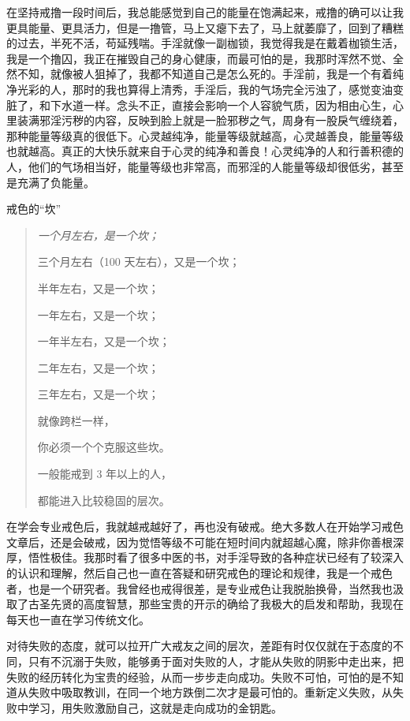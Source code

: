 在坚持戒撸一段时间后，我总能感觉到自己的能量在饱满起来，戒撸的确可以让我更具能量、更具活力，但是一撸管，马上又瘪下去了，马上就萎靡了，回到了糟糕的过去，半死不活，苟延残喘。手淫就像一副枷锁，我觉得我是在戴着枷锁生活，我是一个撸囚，我正在摧毁自己的身心健康，而最可怕的是，我那时浑然不觉、全然不知，就像被人狙掉了，我都不知道自己是怎么死的。手淫前，我是一个有着纯净光彩的人，那时的我也算得上清秀，手淫后，我的气场完全污浊了，感觉变油变脏了，和下水道一样。念头不正，直接会影响一个人容貌气质，因为相由心生，心里装满邪淫污秽的内容，反映到脸上就是一脸邪秽之气，周身有一股戾气缠绕着，那种能量等级真的很低下。心灵越纯净，能量等级就越高，心灵越善良，能量等级也就越高。真正的大快乐就来自于心灵的纯净和善良！心灵纯净的人和行善积德的人，他们的气场相当好，能量等级也非常高，而邪淫的人能量等级却很低劣，甚至是充满了负能量。

戒色的“坎”

\begin{multicols}{2}
    \begin{quotation}\it
        一个月左右，是一个坎；

        三个月左右（100 天左右），又是一个坎；

        半年左右，又是一个坎；

        一年左右，又是一个坎；

        一年半左右，又是一个坎；

        二年左右，又是一个坎；

        三年左右，又是一个坎；

        就像跨栏一样，

        你必须一个个克服这些坎。

        一般能戒到 3 年以上的人，

        都能进入比较稳固的层次。
    \end{quotation}
\end{multicols}

在学会专业戒色后，我就越戒越好了，再也没有破戒。绝大多数人在开始学习戒色文章后，还是会破戒，因为觉悟等级不可能在短时间内就超越心魔，除非你善根深厚，悟性极佳。我那时看了很多中医的书，对手淫导致的各种症状已经有了较深入的认识和理解，然后自己也一直在答疑和研究戒色的理论和规律，我是一个戒色者，也是一个研究者。我曾经也戒得很差，是专业戒色让我脱胎换骨，当然我也汲取了古圣先贤的高度智慧，那些宝贵的开示的确给了我极大的启发和帮助，我现在每天也一直在学习传统文化。

对待失败的态度，就可以拉开广大戒友之间的层次，差距有时仅仅就在于态度的不同，只有不沉溺于失败，能够勇于面对失败的人，才能从失败的阴影中走出来，把失败的经历转化为宝贵的经验，从而一步步走向成功。失败不可怕，可怕的是不知道从失败中吸取教训，在同一个地方跌倒二次才是最可怕的。重新定义失败，从失败中学习，用失败激励自己，这就是走向成功的金钥匙。

